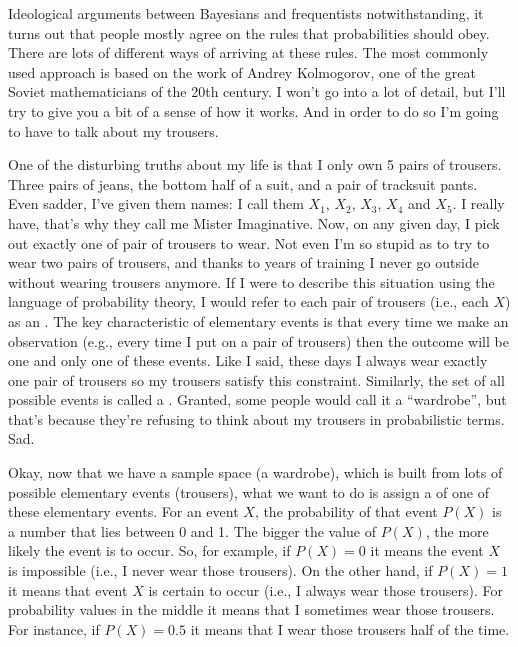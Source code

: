 Ideological arguments between Bayesians and frequentists notwithstanding, it turns out that people mostly agree on the rules that probabilities should obey. There are lots of different ways of arriving at these rules. The most commonly used approach is based on the work of Andrey Kolmogorov, one of the great Soviet mathematicians of the 20th century. I won't go into a lot of detail, but I'll try to give you a bit of a sense of how it works. And in order to do so I'm going to have to talk about my trousers.


One of the disturbing truths about my life is that I only own 5 pairs of trousers. Three pairs of jeans, the bottom half of a suit, and a pair of tracksuit pants. Even sadder, I've given them names: I call them $X_1$, $X_2$, $X_3$, $X_4$ and $X_5$. I really have, that's why they call me Mister Imaginative. Now, on any given day, I pick out exactly one of pair of trousers to wear. Not even I'm so stupid as to try to wear two pairs of trousers, and thanks to years of training I never go outside without wearing trousers anymore. If I were to describe this situation using the language of probability theory, I would refer to each pair of trousers (i.e., each $X$) as an . The key characteristic of elementary events is that every time we make an observation (e.g., every time I put on a pair of trousers) then the outcome will be one and only one of these events. Like I said, these days I always wear exactly one pair of trousers so my trousers satisfy this constraint. Similarly, the set of all possible events is called a . Granted, some people would call it a ``wardrobe'', but that's because they're refusing to think about my trousers in probabilistic terms. Sad.  

Okay, now that we have a sample space (a wardrobe), which is built from lots of possible elementary events (trousers), what we want to do is assign a  of one of these elementary events. For an event $X$, the probability of that event $P(X)$ is a number that lies between 0 and 1. The bigger the value of $P(X)$, the more likely the event is to occur. So, for example, if $P(X) = 0$ it means the event $X$ is impossible (i.e., I never wear those trousers). On the other hand, if $P(X) = 1$ it means that event $X$ is certain to occur (i.e., I always wear those trousers). For probability values in the middle it means that I sometimes wear those trousers. For instance, if $P(X) = 0.5$ it means that I wear those trousers half of the time. 

